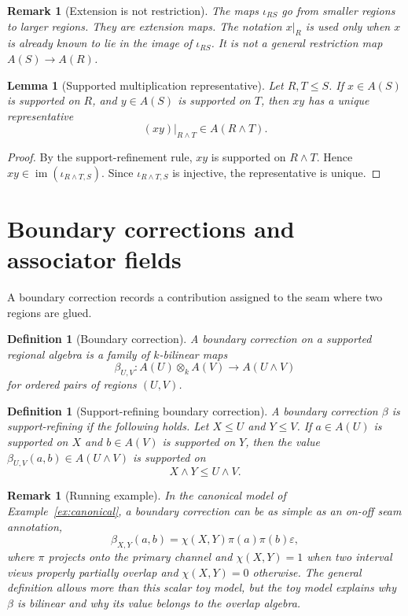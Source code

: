 \documentclass[11pt]{article}
\newtheorem{lemma}[theorem]{Lemma}
\newtheorem{definition}[theorem]{Definition}
\newtheorem{remark}[theorem]{Remark}
\newcommand{\im}{\operatorname{im}}
\begin{document}
\begin{remark}[Extension is not restriction]
The maps \(\iota_{RS}\) go from smaller regions to larger regions. They are extension maps. The notation \(x\rvert_R\) is used only when \(x\) is already known to lie in the image of \(\iota_{RS}\). It is not a general restriction map \(A(S)\to A(R)\).
\end{remark}

\begin{lemma}[Supported multiplication representative]
\label{lem:supported-mult}
Let \(R,T\leq S\). If \(x\in A(S)\) is supported on \(R\), and \(y\in A(S)\) is supported on \(T\), then \(xy\) has a unique representative
\[
(xy)\rvert_{R\wedge T}\in A(R\wedge T).
\]
\end{lemma}

\begin{proof}
By the support-refinement rule, \(xy\) is supported on \(R\wedge T\). Hence \(xy\in \im(\iota_{R\wedge T,S})\). Since \(\iota_{R\wedge T,S}\) is injective, the representative is unique.
\end{proof}

\section{Boundary corrections and associator fields}
\label{sec:corrections}

A boundary correction records a contribution assigned to the seam where two regions are glued.

\begin{definition}[Boundary correction]
A boundary correction on a supported regional algebra is a family of \(k\)-bilinear maps
\[
\beta_{U,V}:A(U)\otimes_k A(V)\to A(U\wedge V)
\]
for ordered pairs of regions \((U,V)\).
\end{definition}

\begin{definition}[Support-refining boundary correction]
A boundary correction \(\beta\) is support-refining if the following holds. Let \(X\leq U\) and \(Y\leq V\). If \(a\in A(U)\) is supported on \(X\) and \(b\in A(V)\) is supported on \(Y\), then the value \(\beta_{U,V}(a,b)\in A(U\wedge V)\) is supported on
\[
X\wedge Y\leq U\wedge V.
\]
\end{definition}

\begin{remark}[Running example]
In the canonical model of Example~\ref{ex:canonical}, a boundary correction can be as simple as an on-off seam annotation,
\[
\beta_{X,Y}(a,b)=\chi(X,Y)\pi(a)\pi(b)\varepsilon,
\]
where \(\pi\) projects onto the primary channel and \(\chi(X,Y)=1\) when two interval views properly partially overlap and \(\chi(X,Y)=0\) otherwise. The general definition allows more than this scalar toy model, but the toy model explains why \(\beta\) is bilinear and why its value belongs to the overlap algebra.
\end{remark}
\end{document}

